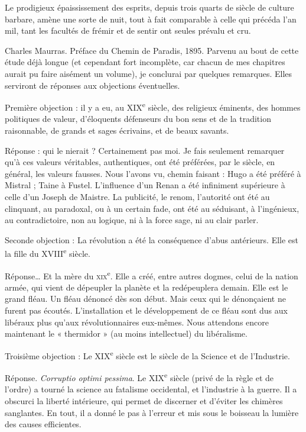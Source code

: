 \documentclass[french,twoside]{book} %
\newenvironment{quoteblock}%
  {\begin{quoting}}
  {\end{quoting}}
\newenvironment{quotebar}{%
    \def\FrameCommand{{\color{rubric!10!}\vrule width 0.5em} \hspace{0.9em}}%
    \def\OuterFrameSep{\itemsep} %
    \MakeFramed {\advance\hsize-\width \FrameRestore}
  }%
  {%
    \endMakeFramed
  }
\renewenvironment{quoteblock}%
  {%
    \savenotes
    \setstretch{0.9}
    \begin{quotebar}
  }
  {%
    \end{quotebar}
    \spewnotes
  }
\begin{document}
\begin{quoteblock}
\noindent Le prodigieux épaississement des esprits, depuis trois quarts de siècle de culture barbare, amène une sorte de nuit, tout à fait comparable à celle qui précéda l’an mil, tant les facultés de frémir et de sentir ont seules prévalu et cru.
\par
\par
{\citbibl Charles Maurras. Préface du Chemin de Paradis, 1895.}
\end{quoteblock}
\noindent Parvenu au bout de cette étude déjà longue (et cependant fort incomplète, car chacun de mes chapitres aurait pu faire aisément un volume), je conclurai par quelques remarques. Elles serviront de réponses aux objections éventuelles.\par
Première objection : il y a eu, au XIX\textsuperscript{e} siècle, des religieux éminents, des hommes politiques de valeur, d’éloquents défenseurs du bon sens et de la tradition raisonnable, de grands et sages écrivains, et de beaux savants.\par
Réponse : qui le nierait ? Certainement pas moi. Je fais seulement remarquer qu’à ces valeurs véritables, authentiques, ont été préférées, par le siècle, en général, les valeurs fausses. Nous l’avons vu, chemin faisant : Hugo a été préféré à Mistral ; Taine à Fustel. L’influence d’un Renan a été infiniment supérieure à celle d’un Joseph de Maistre. La publicité, le renom, l’autorité ont été au clinquant, au paradoxal, ou à un certain fade, ont été au séduisant, à l’ingénieux, au contradictoire, non au logique, ni à la force sage, ni au clair parler.\par
Seconde objection : La révolution a été la conséquence d’abus antérieurs. Elle est la fille du XVIII\textsuperscript{e} siècle.\par
Réponse… Et la mère du \textsc{xix}\textsuperscript{e}. Elle a créé, entre autres dogmes, celui de la nation armée, qui vient de dépeupler la planète et la redépeuplera demain. Elle est le grand fléau. Un fléau dénoncé dès son début. Mais ceux qui le dénonçaient ne furent pas écoutés. L’installation et le développement de ce fléau sont dus aux libéraux plus qu’aux révolutionnaires eux-mêmes. Nous attendons encore maintenant le « thermidor » (au moins intellectuel) du libéralisme.\par
Troisième objection : Le XIX\textsuperscript{e} siècle est le siècle de la Science et de l’Industrie.\par
Réponse. {\itshape Corruptio optimi pessima}. Le XIX\textsuperscript{e} siècle (privé de la règle et de l’ordre) a tourné la science au fatalisme occidental, et l’industrie à la guerre. Il a obscurci la liberté intérieure, qui permet de discerner et d’éviter les chimères sanglantes. En tout, il a donné le pas à l’erreur et mis sous le boisseau la lumière des causes efficientes.\par
\end{document}
